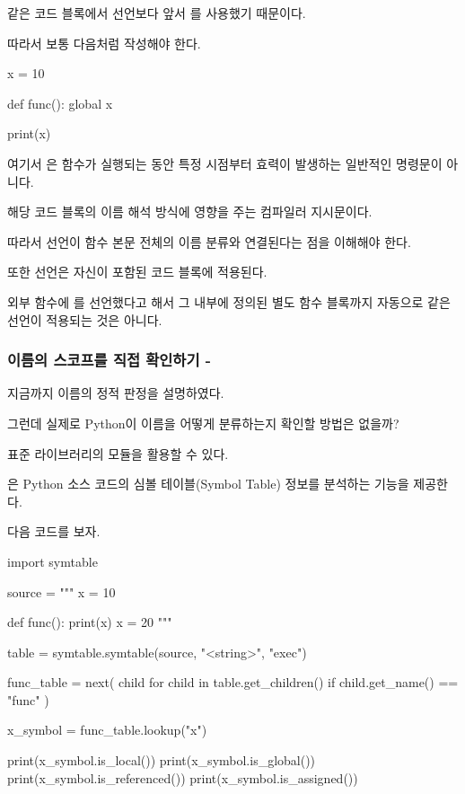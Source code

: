 같은 코드 블록에서  선언보다 앞서 를 사용했기 때문이다.

따라서 보통 다음처럼 작성해야 한다.

\begin{dhkcode}
x = 10

def func():
    global x

    print(x)
\end{dhkcode}

여기서 은 함수가 실행되는 동안 특정 시점부터 효력이 발생하는 일반적인 명령문이 아니다.

\begin{dhksmry}[centered]
해당 코드 블록의 이름 해석 방식에 영향을 주는 컴파일러 지시문이다.
\end{dhksmry}

따라서 선언이 함수 본문 전체의 이름 분류와 연결된다는 점을 이해해야 한다.

또한  선언은 자신이 포함된 코드 블록에 적용된다.

외부 함수에 를 선언했다고 해서 그 내부에 정의된 별도 함수 블록까지 자동으로 같은 선언이 적용되는 것은 아니다.

\subsubsection{이름의 스코프를 직접 확인하기 - }

지금까지 이름의 정적 판정을 설명하였다.

그런데 실제로 Python이 이름을 어떻게 분류하는지 확인할 방법은 없을까?

표준 라이브러리의  모듈을 활용할 수 있다.

은 Python 소스 코드의 심볼 테이블(Symbol Table) 정보를 분석하는 기능을 제공한다.

다음 코드를 보자.

\begin{dhkcode}
import symtable

source = """
x = 10

def func():
    print(x)
    x = 20
"""

table = symtable.symtable(source, "<string>", "exec")

func_table = next(
    child
    for child in table.get_children()
    if child.get_name() == "func"
)

x_symbol = func_table.lookup("x")

print(x_symbol.is_local())
print(x_symbol.is_global())
print(x_symbol.is_referenced())
print(x_symbol.is_assigned())
\end{dhkcode}

